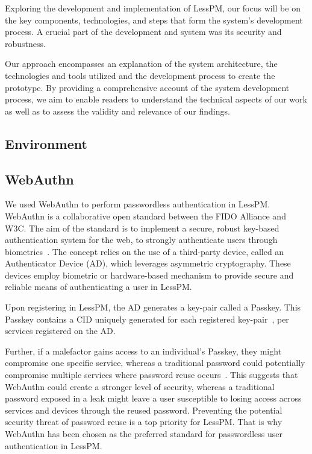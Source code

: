 
Exploring the development and implementation of LessPM, our focus will be on the
key components, technologies, and steps that form the system's development
process.
A crucial part of the development and system was its security and robustness.

Our approach encompasses an explanation of the system architecture, the
technologies and tools utilized and the development process to create the
prototype.
By providing a comprehensive account of the system development process, we aim
to enable readers to understand the technical aspects of our work as well
as to assess the validity and relevance of our findings.

\subsection{Environment}\label{subsec:environment}


\subsection{WebAuthn}\label{subsec:webauthn-methodology}
We used WebAuthn to perform passwordless authentication in LessPM\@.
WebAuthn is a collaborative open standard between the FIDO Alliance and W3C\@.
The aim of the standard is to implement a secure, robust key-based
authentication system for the web, to strongly authenticate users through
biometrics~\cite{webauthn_level_2}.
The concept relies on the use of a third-party device, called an
Authenticator Device (AD), which leverages asymmetric cryptography.
These devices employ biometric or hardware-based mechanism to provide secure
and reliable means of authenticating a user in LessPM\@.

Upon registering in LessPM, the AD generates a key-pair called a Passkey.
This Passkey contains a CID uniquely generated for each registered
key-pair~\cite{webauthn_credential_id,webauthn_public_key_credential}, per
services registered on the AD\@.

Further, if a malefactor gains access to an individual's Passkey, they might
compromise one specific service, whereas a traditional password could
potentially compromise multiple services where password reuse
occurs~\cite{wang2018next}.
This suggests that WebAuthn could create a stronger level of security, whereas
a traditional password exposed in a leak might leave a user susceptible to
losing access across services and devices through the reused password.
Preventing the potential security threat of password reuse is a top priority
for LessPM\@.
That is why WebAuthn has been chosen as the preferred standard for
passwordless user authentication in LessPM\@.

